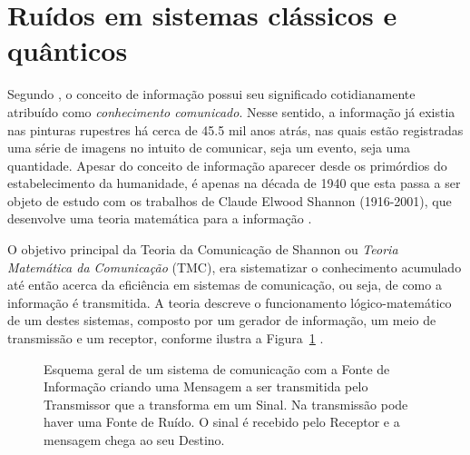 \section{Ruídos em sistemas clássicos e quânticos}\label{sec:ruidos}

Segundo \textcite{conceitoinformação}, o conceito de informação possui seu significado cotidianamente atribuído como \textit{conhecimento comunicado}. Nesse sentido, a informação já existia nas pinturas rupestres há cerca de \num{45.5} mil anos atrás, nas quais estão registradas uma série de imagens no intuito de comunicar, seja um evento, seja uma quantidade. Apesar do conceito de informação aparecer desde os primórdios do estabelecimento da humanidade, é apenas na década de 1940 que esta passa a ser objeto de estudo com os trabalhos de Claude Elwood Shannon (1916-2001), que desenvolve uma teoria matemática para a informação \cite{CiênciaTransiçãoSeculosa}.

O objetivo principal da Teoria da Comunicação de Shannon ou \textit{Teoria Matemática da Comunicação} (TMC), era sistematizar o conhecimento acumulado até então acerca da eficiência em sistemas de comunicação, ou seja, de como a informação é transmitida. A teoria descreve o funcionamento lógico-matemático de um destes sistemas, composto por um gerador de informação, um meio de transmissão e um receptor, conforme ilustra a Figura~\ref{comunicshannon} \cite{MTC}.

\begin{figure}[ht!]
  \centering
  \caption{Esquema geral de um sistema de comunicação com a Fonte de Informação criando uma Mensagem a ser transmitida pelo Transmissor que a transforma em um Sinal. Na transmissão pode haver uma Fonte de Ruído. O sinal é recebido pelo Receptor e a mensagem chega ao seu Destino.}\label{comunicshannon}
\end{figure}

